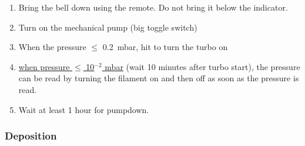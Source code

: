 \begin{enumerate}
\item Bring the bell down using the remote. Do not bring it below the indicator.
\item Turn on the mechanical pump (big toggle switch)
\item When the pressure $\leq$ \SI{0.2}{\milli\bar}, hit  to turn the turbo on\\
\item \underline{when pressure $\leq$ 10$^{-2}$ mbar} (wait 10 minutes after turbo start), the pressure can be read by turning the filament on and then off as soon as the pressure is read.\\
\item Wait at least 1 hour for pumpdown.
\end{enumerate}
\subsubsection{Deposition}
